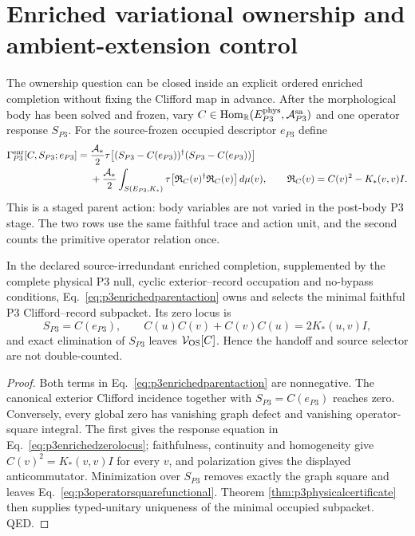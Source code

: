 \section{Enriched variational ownership and ambient-extension control}
\label{app:p3ownership}

The ownership question can be closed inside an explicit ordered enriched
completion without fixing the Clifford map in advance.  After the
morphological body has been solved and frozen, vary
$C\in\operatorname{Hom}_{\mathbb R}(E_{P3}^{\rm phys},
\mathcal A_{P3}^{\rm sa})$ and one operator response $S_{P3}$.  For the
source-frozen occupied descriptor $e_{P3}$ define
\begin{align}
 \Gamma_{P3}^{\rm enr}[C,S_{P3};e_{P3}]
 ={}&\frac{\mathcal A_*}{2}\tau\!\left[
 (S_{P3}-C(e_{P3}))^\dagger(S_{P3}-C(e_{P3}))\right]
 \nonumber\\
 &+\frac{\mathcal A_*}{2}\int_{S(E_{P3},K_*)}
 \tau\!\left[\mathfrak R_C(v)^\dagger\mathfrak R_C(v)\right]d\mu(v),
 \qquad
 \mathfrak R_C(v)=C(v)^2-K_*(v,v)I.
 \label{eq:p3enrichedparentaction}
\end{align}
This is a staged parent action: body variables are not varied in the
post-body P3 stage.  The two rows use the same faithful trace and action unit,
and the second counts the primitive operator relation once.

\begin{theorem}
\label{thm:p3enrichedownership}
In the declared source-irredundant enriched completion, supplemented by the
complete physical P3 null, cyclic exterior--record occupation and no-bypass
conditions, Eq.~\eqref{eq:p3enrichedparentaction} owns and selects the minimal
faithful P3 Clifford--record subpacket.  Its zero locus is
\begin{equation}
 S_{P3}=C(e_{P3}),
 \qquad
 C(u)C(v)+C(v)C(u)=2K_*(u,v)I,
 \label{eq:p3enrichedzerolocus}
\end{equation}
and exact elimination of $S_{P3}$ leaves
$\mathcal V_{\rm OS}[C]$.  Hence the handoff and source selector are not
double-counted.
\end{theorem}

\begin{proof}
Both terms in Eq.~\eqref{eq:p3enrichedparentaction} are nonnegative.  The
canonical exterior Clifford incidence together with
$S_{P3}=C(e_{P3})$ reaches zero.  Conversely, every global zero has vanishing
graph defect and vanishing operator-square integral.  The first gives the
response equation in Eq.~\eqref{eq:p3enrichedzerolocus}; faithfulness,
continuity and homogeneity give
$C(v)^2=K_*(v,v)I$ for every $v$, and polarization gives the displayed
anticommutator.  Minimization over $S_{P3}$ removes exactly the graph square
and leaves Eq.~\eqref{eq:p3operatorsquarefunctional}.  Theorem
\ref{thm:p3physicalcertificate} then supplies typed-unitary uniqueness of the
minimal occupied subpacket. QED.
\end{proof}

